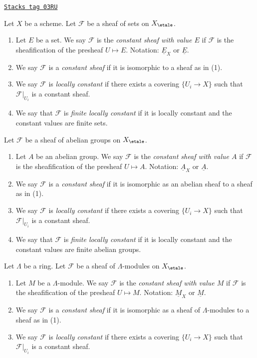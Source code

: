 \begin{definition}
\label{etale-cohomology-definition-finite-locally-constant}
\href{https://stacks.math.columbia.edu/tag/03RU}{\texttt{Stacks tag 03RU}}

Let $X$ be a scheme.
Let $\mathcal{F}$ be a sheaf of sets on $X_\etale$.
\begin{enumerate}
\item Let $E$ be a set. We say $\mathcal{F}$ is the
{\it constant sheaf with value $E$} if $\mathcal{F}$ is the
sheafification of the presheaf $U \mapsto E$.
Notation: $\underline{E}_X$ or $\underline{E}$.
\item We say $\mathcal{F}$ is a {\it constant sheaf} if it is
isomorphic to a sheaf as in (1).
\item We say $\mathcal{F}$ is {\it locally constant} if there exists a
covering $\{U_i \to X\}$ such that $\mathcal{F}|_{U_i}$ is a constant sheaf.
\item We say that $\mathcal{F}$ is {\it finite locally constant} if it
is locally constant and the constant values are finite sets.
\end{enumerate}
Let $\mathcal{F}$ be a sheaf of abelian groups on $X_\etale$.
\begin{enumerate}
\item Let $A$ be an abelian group.
We say $\mathcal{F}$ is the {\it constant sheaf with value $A$} if
$\mathcal{F}$ is the sheafification of the presheaf $U \mapsto A$.
Notation: $\underline{A}_X$ or $\underline{A}$.
\item We say $\mathcal{F}$ is a {\it constant sheaf} if it is isomorphic
as an abelian sheaf to a sheaf as in (1).
\item We say $\mathcal{F}$ is {\it locally constant} if there exists a
covering $\{U_i \to X\}$ such that $\mathcal{F}|_{U_i}$ is a constant sheaf.
\item We say that $\mathcal{F}$ is {\it finite locally constant} if it
is locally constant and the constant values are finite abelian groups.
\end{enumerate}
Let $\Lambda$ be a ring. Let $\mathcal{F}$ be a sheaf of $\Lambda$-modules
on $X_\etale$.
\begin{enumerate}
\item Let $M$ be a $\Lambda$-module.
We say $\mathcal{F}$ is the {\it constant sheaf with value $M$} if
$\mathcal{F}$ is the sheafification of the presheaf $U \mapsto M$.
Notation: $\underline{M}_X$ or $\underline{M}$.
\item We say $\mathcal{F}$ is a {\it constant sheaf} if it is isomorphic
as a sheaf of $\Lambda$-modules to a sheaf as in (1).
\item We say $\mathcal{F}$ is {\it locally constant} if there exists a
covering $\{U_i \to X\}$ such that $\mathcal{F}|_{U_i}$ is a constant sheaf.
\end{enumerate}
\end{definition}

